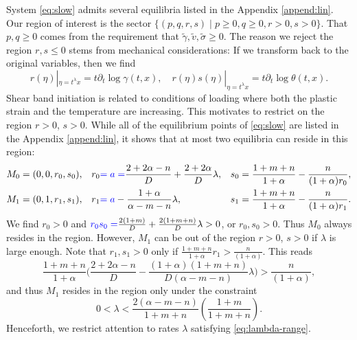 \documentclass[a4paper,11pt]{article}
\def\blue{\color{blue}}
\def\tg{{\tilde{\gamma}}}
\def\tv{{\tilde{v}}}
\def\ts{{\tilde{\sigma}}}
\theoremstyle{remark}
\begin{document}
System \eqref{eq:slow} admits several equilibria listed in the Appendix \ref{append:lin}. Our region of interest is the sector $\{(p,q,r,s) \; | \; p\ge0, q\ge0, r>0, s>0 \}$. That $p,q\ge0$ comes from the requirement that $\tg,\tv,\ts\ge0$. The reason we reject the region $r,s\le0$ stems from mechanical considerations: If we transform back to the original variables, then we find
\begin{equation*}
 r(\eta)|_{\eta=t^\lambda x}=t\partial_t\log \gamma(t,x), \quad r(\eta)s(\eta)|_{\eta=t^\lambda x}=t\partial_t \log \theta(t,x).
\end{equation*}
Shear band initiation is related to conditions of loading where both the plastic strain and the temperature are increasing. This motivates to restrict on the region $r > 0$, $s > 0$. {\blue While all of the equilibrium points of \eqref{eq:slow} are listed in the Appendix \ref{append:lin}, it shows that at most two equilibria} can reside in this region:
\begin{align*}
 M_0 &= (0,0,r_0,s_0), & r_0 &{\blue =a=}\frac{2+2\alpha-n}{D} + \frac{2+2\alpha}{D}\lambda, & s_0&=\frac{1+m+n}{1+\alpha} - \frac{n}{(1+\alpha)r_0},\\
 M_1 &= (0,1,r_1,s_1), & r_1 &{\blue = a}-\frac{1+\alpha}{\alpha-m-n}\lambda, & s_1&=\frac{1+m+n}{1+\alpha} - \frac{n}{(1+\alpha)r_1}.
\end{align*}
We find $r_0>0$ and ${\blue r_0s_0 =} \frac{2(1+m)}{D} + \frac{2(1+m+n)}{D}\lambda>0$, or $r_0, s_0>0$. Thus $M_0$ always resides in the region. However, $M_1$ can be out of the region $r>0$, $s>0$ if $\lambda$ is large enough. Note that $r_1,s_1>0$ only if $\frac{1+m+n}{1+\alpha}r_1 > \frac{n}{(1+\alpha)}$. This reads
$$\frac{1+m+n}{1+\alpha}\Big(\frac{2+2\alpha-n}{D} - \frac{(1+\alpha)(1+m+n)}{D(\alpha-m-n)}\lambda\Big) > \frac{n}{(1+\alpha)},$$
and thus $M_1$ resides in the region only under the constraint
\begin{equation} \label{eq:lambda-range}
 0< \lambda < \frac{2(\alpha-m-n)}{1+m+n}\left(\frac{1+m}{1+m+n}\right).
\end{equation}
Henceforth, we restrict attention to rates {\blue $\lambda$ satisfying} \eqref{eq:lambda-range}.
\end{document}
